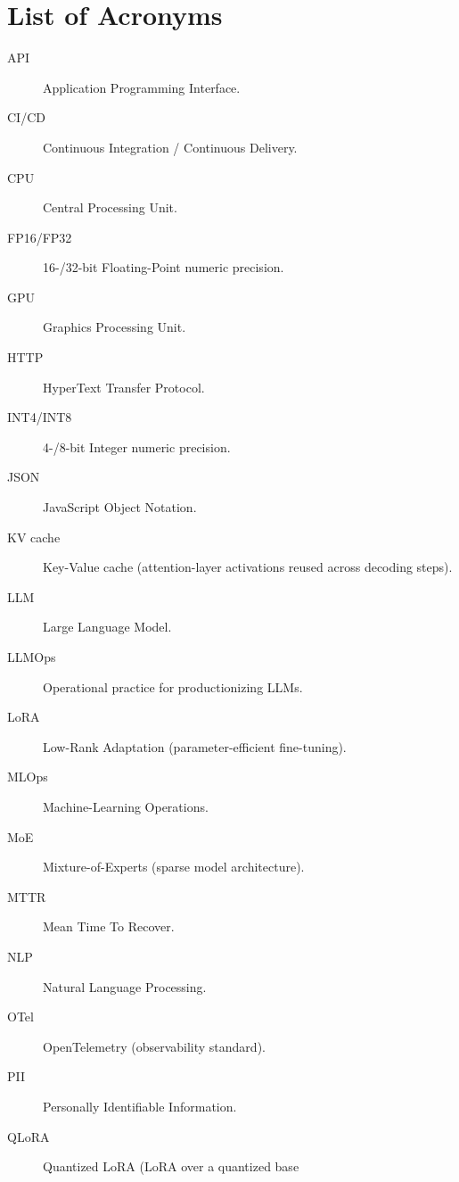 \chapter*{List of Acronyms}


\begin{description}
  \item[API]           Application Programming Interface.
  \item[CI/CD]         Continuous Integration / Continuous Delivery.
  \item[CPU]           Central Processing Unit.
  \item[FP16/FP32]     16-/32-bit Floating-Point numeric precision.
  \item[GPU]           Graphics Processing Unit.
  \item[HTTP]          HyperText Transfer Protocol.
  \item[INT4/INT8]     4-/8-bit Integer numeric precision.
  \item[JSON]          JavaScript Object Notation.
  \item[KV cache]      Key-Value cache (attention-layer activations
                       reused across decoding steps).
  \item[LLM]           Large Language Model.
  \item[LLMOps]        Operational practice for productionizing LLMs.
  \item[LoRA]          Low-Rank Adaptation (parameter-efficient
                       fine-tuning).
  \item[MLOps]         Machine-Learning Operations.
  \item[MoE]           Mixture-of-Experts (sparse model architecture).
  \item[MTTR]          Mean Time To Recover.
  \item[NLP]           Natural Language Processing.
  \item[OTel]          OpenTelemetry (observability standard).
  \item[PII]           Personally Identifiable Information.
  \item[QLoRA]         Quantized LoRA (LoRA over a quantized base

\end{description}
